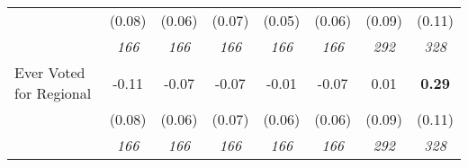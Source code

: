 \begin{tabular}{l c c c c c c c}
& (0.08) & (0.06) & (0.07) & (0.05) & (0.06) & (0.09) & (0.11) \\
& \textit{ 166 } & \textit{ 166 } & \textit{ 166 } & \textit{ 166 } & \textit{ 166 } & \textit{ 292 } & \textit{ 328 } \\
Ever Voted for Regional & -0.11 & -0.07 & -0.07 & -0.01 & -0.07 & 0.01 & \textbf{ 0.29 } \\
& (0.08) & (0.06) & (0.07) & (0.06) & (0.06) & (0.09) & (0.11) \\
& \textit{ 166 } & \textit{ 166 } & \textit{ 166 } & \textit{ 166 } & \textit{ 166 } & \textit{ 292 } & \textit{ 328 } \\
\bottomrule
\end{tabular}
